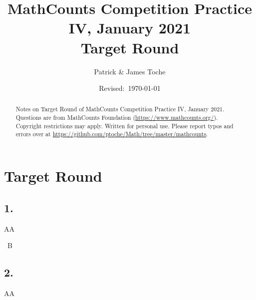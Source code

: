 \documentclass[12pt]{article}
\title{MathCounts Competition Practice IV, January 2021 \\ Target Round}
\author{Patrick \& James Toche}
\date{Revised:~\today}
\begin{document}
\maketitle
\begin{minipage}{\textwidth}
\begin{abstract}\setlength{\parindent}{0pt}%
Notes on Target Round of MathCounts Competition Practice IV, January 2021. 
Questions are from MathCounts Foundation (\url{https://www.mathcounts.org/}). Copyright restrictions may apply. Written for personal use. 
Please report typos and errors over at \url{https://github.com/ptoche/Math/tree/master/mathcounts}. 
\end{abstract}
\end{minipage}

\thispagestyle{empty}
\clearpage
\addtocounter{page}{-1}

\section*{Target Round}


\subsection*{1.}
AA

\fbox{\phantom{ANSWER}}~B

\begin{answer}
%
\end{answer}


\subsection*{2.}
AA
\end{document}
